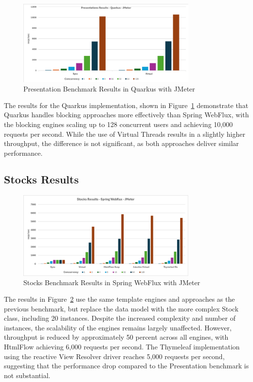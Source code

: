 \begin{figure}[h]
     \centering
     \includegraphics[width=0.8\textwidth]{./Graphs/presentations-quarkus-jmeter.png}
     \caption{Presentation Benchmark Results in Quarkus with JMeter}\label{fig:presentations-quarkus-jmeter}
\end{figure}

The results for the Quarkus implementation, shown in
Figure~\ref{fig:presentations-quarkus-jmeter} demonstrate that Quarkus handles
blocking approaches more effectively than Spring WebFlux, with the blocking
engines scaling up to 128 concurrent users and achieving 10,000 requests per
second. While the use of Virtual Threads results in a slightly higher
throughput, the difference is not significant, as both approaches deliver
similar performance.

\subsection{Stocks Results}

\begin{figure}[h]
     \centering
     \includegraphics[width=0.8\textwidth]{./Graphs/stocks-webflux-jmeter.png}
     \caption{Stocks Benchmark Results in Spring WebFlux with JMeter}\label{fig:stocks-webflux-jmeter}
\end{figure}

The results in Figure~\ref{fig:stocks-webflux-jmeter} use the same template
engines and approaches as the previous benchmark, but replace the data model
with the more complex Stock class, including 20 instances. Despite the
increased complexity and number of instances, the scalability of the engines
remains largely unaffected. However, throughput is reduced by approximately 50
percent across all engines, with HtmlFlow achieving 6,000 requests per second.
The Thymeleaf implementation using the reactive View Resolver driver reaches
5,000 requests per second, suggesting that the performance drop compared to the
Presentation benchmark is not substantial.


